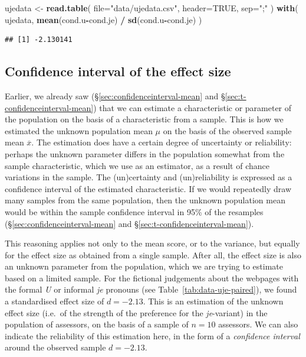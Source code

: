 \documentclass[
]{book}
\newenvironment{Shaded}{\begin{snugshade}}{\end{snugshade}}
\newcommand{\AttributeTok}[1]{\textcolor[rgb]{0.13,0.29,0.53}{#1}}
\newcommand{\ConstantTok}[1]{\textcolor[rgb]{0.56,0.35,0.01}{#1}}
\newcommand{\FunctionTok}[1]{\textcolor[rgb]{0.13,0.29,0.53}{\textbf{#1}}}
\newcommand{\NormalTok}[1]{#1}
\newcommand{\OtherTok}[1]{\textcolor[rgb]{0.56,0.35,0.01}{#1}}
\newcommand{\SpecialCharTok}[1]{\textcolor[rgb]{0.81,0.36,0.00}{\textbf{#1}}}
\newcommand{\StringTok}[1]{\textcolor[rgb]{0.31,0.60,0.02}{#1}}
\begin{document}
\begin{Shaded}
\begin{Highlighting}[]
\NormalTok{ujedata }\OtherTok{\textless{}{-}} \FunctionTok{read.table}\NormalTok{( }\AttributeTok{file=}\StringTok{"data/ujedata.csv"}\NormalTok{, }\AttributeTok{header=}\ConstantTok{TRUE}\NormalTok{, }\AttributeTok{sep=}\StringTok{";"}\NormalTok{ )}
\FunctionTok{with}\NormalTok{( ujedata, }\FunctionTok{mean}\NormalTok{(cond.u}\SpecialCharTok{{-}}\NormalTok{cond.je) }\SpecialCharTok{/} \FunctionTok{sd}\NormalTok{(cond.u}\SpecialCharTok{{-}}\NormalTok{cond.je) )}
\end{Highlighting}
\end{Shaded}

\begin{verbatim}
## [1] -2.130141
\end{verbatim}

\hypertarget{sec:confint-effectsize}{%
\subsection{Confidence interval of the effect size}\label{sec:confint-effectsize}}

Earlier, we already saw
(§\ref{sec:confidenceinterval-mean} and
§\ref{sec:t-confidenceinterval-mean})
that we can estimate a characteristic
or parameter of the population on the basis of a characteristic
from a sample. This is how we estimated the unknown population mean \(\mu\)
on the basis of the observed sample mean
\(\overline{x}\). The estimation does have a certain degree of
uncertainty or reliability: perhaps the unknown parameter differs
in the population somewhat from the sample characteristic,
which we use as an estimator, as a result of chance variations in the
sample. The (un)certainty and (un)reliability is expressed as
a confidence interval of the estimated characteristic.
If we would repeatedly draw many samples from the same population, then the unknown population mean would be within the sample confidence interval in 95\% of the resamples
(§\ref{sec:confidenceinterval-mean} and §\ref{sec:t-confidenceinterval-mean}).

This reasoning applies not only to the mean score, or to the
variance, but equally for the effect size as obtained from a single sample.
After all, the effect size
is also an unknown parameter from the population, which we are trying to estimate
based on a limited sample. For the fictional judgements
about the webpages with the formal \emph{U} or informal \emph{je} pronouns (see
Table~\ref{tab:data-uje-paired}), we found a standardised effect size
of \(d=-2.13\). This is an estimation of the unknown
effect size (i.e.~of the strength of the preference for the \emph{je}-variant)
in the population of assessors, on the basis of a sample of \(n=10\)
assessors. We can also indicate the reliability of this estimation
here, in the form of a \emph{confidence interval} around the
observed sample \(d=-2.13\).
\end{document}
